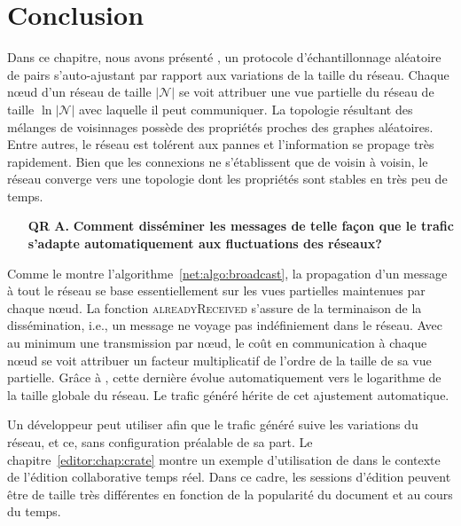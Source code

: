 
\section{Conclusion}
\label{net:sec:conclusion}

Dans ce chapitre, nous avons présenté \SPRAY, un protocole d'échantillonnage
aléatoire de pairs s'auto-ajustant par rapport aux variations de la taille du
réseau. Chaque nœud d'un réseau de taille $|\mathcal{N}|$ se voit attribuer une
vue partielle du réseau de taille $\ln |\mathcal{N}|$ avec laquelle il peut
communiquer. La topologie résultant des mélanges de voisinnages possède des
propriétés proches des graphes aléatoires. Entre autres, le réseau est tolérent
aux pannes et l'information se propage très rapidement. Bien que les connexions
ne s'établissent que de voisin à voisin, le réseau converge vers une topologie
dont les propriétés sont stables en très peu de temps.

\begin{itemize}
\item [\textbf{QR A.}] \textbf{Comment disséminer les messages de telle façon
    que le trafic s'adapte automatiquement aux fluctuations des réseaux?}
\end{itemize}


%   

Comme le montre l'algorithme~\ref{net:algo:broadcast}, la propagation d'un
message à tout le réseau se base essentiellement sur les vues partielles
maintenues par chaque nœud. La fonction \textsc{alreadyReceived} s'assure de la
terminaison de la dissémination, i.e., un message ne voyage pas indéfiniement
dans le réseau. Avec au minimum une transmission par nœud, le coût en
communication à chaque nœud se voit attribuer un facteur multiplicatif de
l'ordre de la taille de sa vue partielle. Grâce à \SPRAY, cette dernière évolue
automatiquement vers le logarithme de la taille globale du réseau. Le trafic
généré hérite de cet ajustement automatique.

Un développeur peut utiliser \SPRAY afin que le trafic généré suive les
variations du réseau, et ce, sans configuration préalable de sa part. Le
chapitre~\ref{editor:chap:crate} montre un exemple d'utilisation de \SPRAY dans
le contexte de l'édition collaborative temps réel. Dans ce cadre, les sessions
d'édition peuvent être de taille très différentes en fonction de la popularité
du document et au cours du temps. 


